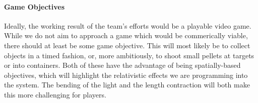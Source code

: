 \documentclass[12pt]{article}
\begin{document}
\paragraph{Game Objectives}
Ideally, the working result of the team's efforts would be a playable video game. While we do not aim to approach a game which would be commerically viable, there should at least be some game objective. This will most likely be to collect objects in a timed fashion, or, more ambitiously, to shoot small pellets at targets or into containers. Both of these have the advantage of being spatially-based objectives, which will highlight the relativistic effects we are programming into the system. The bending of the light and the length contraction will both make this more challenging for players.





























 
\end{document}
